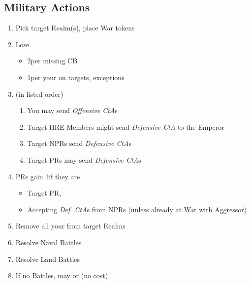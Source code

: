 \documentclass[10pt]{article}
\begin{document}
\addfooter

\subsection*{Military Actions}
\begin{enumerate}
	\item Pick target Realm(s), place War tokens
	\item Lose \stability
	\begin{itemize}
		\item {}2\stability per missing CB
		\item 1\stability per your \marriage on targets, exceptions
	\end{itemize}
	\item {} (in listed order)
	\begin{enumerate}[label=\alph*.]
		\item You may send \emph{Offensive CtA}s
		\item {}Target HRE Members might send \emph{Defensive CtA} to the Emperor
		\item Target NPRs send \emph{Defensive CtA}s
		\item Target PRs may send \emph{Defensive CtA}s
	\end{enumerate}
	\item PRs gain 1\milpower if they are
	\begin{itemize}
		\item Target PR, 
		\item Accepting \emph{Def. CtA}s from NPRs (unless already at War with Aggressor)
	\end{itemize}
	\item Remove all your \influence from target Realms
	\item Resolve Naval Battles
	\item Resolve Land Battles
	\item If no Battles, may  or  (no \milpower cost)
\end{enumerate}
\end{document}
